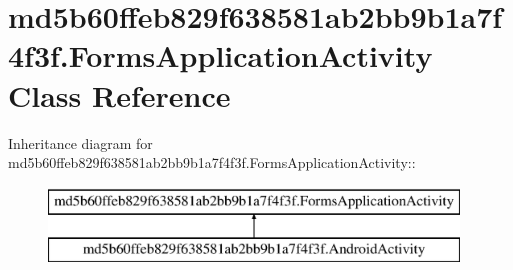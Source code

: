 \hypertarget{classmd5b60ffeb829f638581ab2bb9b1a7f4f3f_1_1_forms_application_activity}{
\section{md5b60ffeb829f638581ab2bb9b1a7f4f3f.FormsApplicationActivity Class Reference}
\label{classmd5b60ffeb829f638581ab2bb9b1a7f4f3f_1_1_forms_application_activity}
}
Inheritance diagram for md5b60ffeb829f638581ab2bb9b1a7f4f3f.FormsApplicationActivity::\begin{figure}[H]
\begin{center}
\leavevmode
\includegraphics[height=2cm]{classmd5b60ffeb829f638581ab2bb9b1a7f4f3f_1_1_forms_application_activity}
\end{center}
\end{figure}
